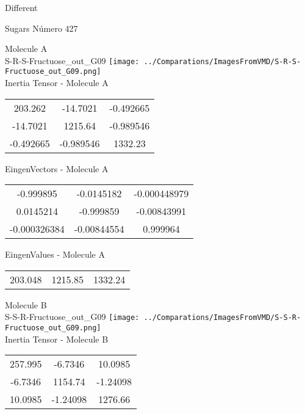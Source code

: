 \begin{center}
\vtab
\vtab
\textcolor{NavyBlue}{\Large Different}
\end{center}

 \newpage

\vtab[-2cm]
\begin{center}
{\large Sugars \tab Número 427}
\end{center}
\begin{multicols}{2}
\begin{center}

Molecule A \\ 
S-R-S-Fructuose\_out\_G09
\texttt{[image: ../Comparations/ImagesFromVMD/S-R-S-Fructuose\_out\_G09.png]}
\\
Inertia Tensor - Molecule A \\
\vtab

\begin{tabular}{|c c c|}
203.262	 & 	-14.7021	 & 	-0.492665	 \\
-14.7021	 & 	1215.64	 & 	-0.989546	 \\
-0.492665	 & 	-0.989546	 & 	1332.23
\end{tabular}

\vtab
 EingenVectors - Molecule A     \\
\vtab
\begin{tabular}{|c c c|}
-0.999895	 & 	-0.0145182	 & 	-0.000448979	 \\
0.0145214	 & 	-0.999859	 & 	-0.00843991	 \\
-0.000326384	 & 	-0.00844554	 & 	0.999964
\end{tabular}

\vtab
 EingenValues - Molecule A     \\
\vtab
\begin{tabular}{|c c c|}
203.048	 & 	1215.85	 & 	1332.24	 \\
\end{tabular}
\columnbreak

Molecule B \\ 
S-S-R-Fructuose\_out\_G09
\texttt{[image: ../Comparations/ImagesFromVMD/S-S-R-Fructuose\_out\_G09.png]}
\\
Inertia Tensor - Molecule B \\
\vtab

\begin{tabular}{|c c c|}
257.995	 & 	-6.7346	 & 	10.0985	 \\
-6.7346	 & 	1154.74	 & 	-1.24098	 \\
10.0985	 & 	-1.24098	 & 	1276.66
\end{tabular}


\end{center}
\end{multicols}
